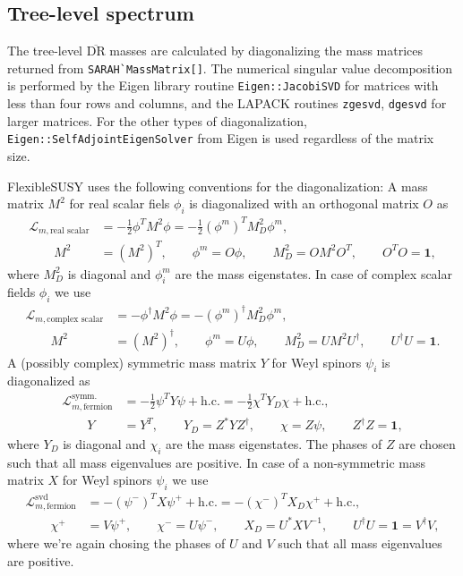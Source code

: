 \documentclass[final,3p,11pt,pdflatex]{elsarticle}
\makeatletter
\newcommand{\fs}{FlexibleSUSY\@\xspace}
\newcommand{\code}[1]{\lstinline|#1|}  %
\newcommand{\textoverline}[1]{$\overline{\mbox{#1}}$}
\newcommand{\DRbar}{\textoverline{DR}\xspace}
\newcommand{\Lagr}{\mathcal{L}}
\newcommand{\unity}{\mathbf{1}}
\makeatother
\begin{document}
\subsection{Tree-level spectrum}
\label{sec:TreeLevelSpectrum}
The tree-level \DRbar masses are calculated by diagonalizing the mass
matrices returned from \code{SARAH`MassMatrix[]}.  The numerical
singular value decomposition is performed by the Eigen library routine
\code{Eigen::JacobiSVD} for matrices with less than four rows and
columns, and the LAPACK routines \code{zgesvd}, \code{dgesvd} for
larger matrices.  For the other types of diagonalization,
\code{Eigen::SelfAdjointEigenSolver} from Eigen is used regardless of
the matrix size.

\fs uses the following conventions for the diagonalization: A mass
matrix $M^2$ for real scalar fiels $\phi_i$ is diagonalized with an
orthogonal matrix $O$ as
%
\begin{align}
  \Lagr_{m,\text{real scalar}}
  &= - \frac{1}{2} \phi^T M^2 \phi
  = - \frac{1}{2} (\phi^m)^T M^2_D \phi^m, \\
  \qquad M^2 &= (M^2)^T ,
  \qquad \phi^m = O \phi ,
  \qquad M^2_D = O M^2 O^T ,
  \qquad O^T O = \unity ,
\end{align}
%
where $M^2_D$ is diagonal and $\phi^m_i$ are the mass eigenstates.  In
case of complex scalar fields $\phi_i$ we use
%
\begin{align}
  \Lagr_{m,\text{complex scalar}}
  &= - \phi^\dagger M^2 \phi
  = - (\phi^m)^\dagger M^2_D \phi^m, \\
  \qquad M^2 &= (M^2)^\dagger ,
  \qquad \phi^m = U \phi ,
  \qquad M^2_D = U M^2 U^\dagger ,
  \qquad U^\dagger U = \unity .
\end{align}
%
A (possibly complex) symmetric mass matrix $Y$ for Weyl spinors
$\psi_i$ is diagonalized as
%
\begin{align}
  \Lagr_{m,\text{fermion}}^\text{symm.}
  &= - \frac{1}{2} \psi^T Y \psi + \text{h.c.}
  = - \frac{1}{2} \chi^T Y_D \chi + \text{h.c.}, \\
  \qquad Y &= Y^T ,
  \qquad Y_D = Z^* Y Z^\dagger ,
  \qquad \chi = Z \psi ,
  \qquad Z^\dagger Z = \unity ,
\end{align}
%
where $Y_D$ is diagonal and $\chi_i$ are the mass eigenstates.  The
phases of $Z$ are chosen such that all mass eigenvalues are positive.
In case of a non-symmetric mass matrix $X$ for Weyl spinors $\psi_i$
we use
%
\begin{align}
  \Lagr_{m,\text{fermion}}^\text{svd}
  &= - (\psi^-)^T X \psi^+ + \text{h.c.}
  = - (\chi^-)^T X_D \chi^+ + \text{h.c.}, \\
  \qquad \chi^+ &= V \psi^+ ,
  \qquad \chi^- = U \psi^- ,
  \qquad X_D = U^* X V^{-1} ,
  \qquad U^\dagger U = \unity = V^\dagger V ,
\end{align}
%
where we're again chosing the phases of $U$ and $V$ such that all mass
eigenvalues are positive.
\end{document}
